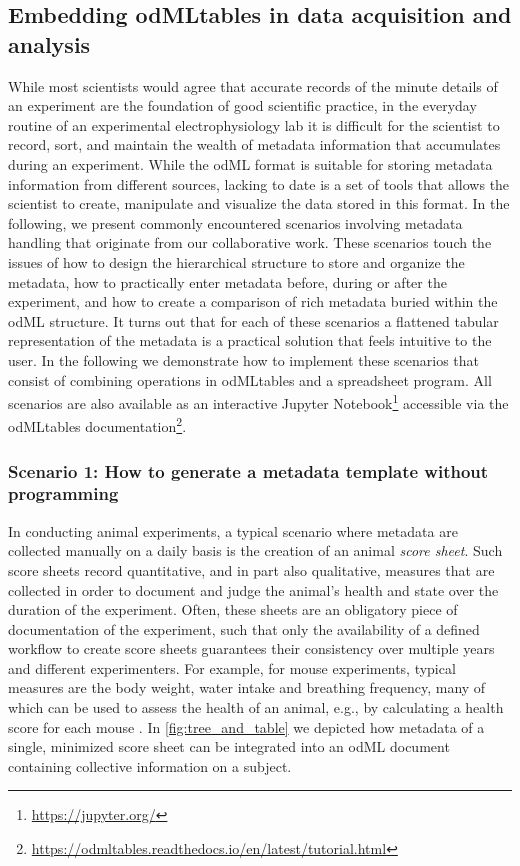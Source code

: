 \subsection{Embedding odMLtables in data acquisition and analysis}
\label{sec:Illustrative-Examples}

While most scientists would agree that accurate records of the minute details of an experiment are the foundation of good scientific practice, in the everyday routine of an experimental electrophysiology lab it is difficult for the scientist to record, sort, and maintain the wealth of metadata information that accumulates during an experiment. While the odML format is suitable for storing metadata information from different sources, lacking to date is a set of tools that allows the scientist to create, manipulate and visualize the data stored in this format. In the following, we present commonly encountered scenarios involving metadata handling that originate from our collaborative work. These scenarios touch the issues of how to design the hierarchical structure to store and organize the metadata, how to practically enter metadata before, during or after the experiment, and how to create a comparison of rich metadata buried within the odML structure. It turns out that for each of these scenarios a flattened tabular representation of the metadata is a practical solution that feels intuitive to the user. In the following we demonstrate how to implement these scenarios that consist of combining operations in odMLtables and a spreadsheet program. All scenarios are also available as an interactive Jupyter Notebook\footnote{\url{https://jupyter.org/}} accessible via the odMLtables documentation\footnote{\url{https://odmltables.readthedocs.io/en/latest/tutorial.html}}.

\subsubsection*{Scenario 1: How to generate a metadata template without programming}
\label{sec:Template-Generation}
In conducting animal experiments, a typical scenario where metadata are collected manually on a daily basis is the creation of an animal \textit{score sheet}. Such score sheets record quantitative, and in part also qualitative, measures that are collected in order to document and judge the animal's health and state over the duration of the experiment. Often, these sheets are an obligatory piece of documentation of the experiment, such that only the availability of a defined workflow to create score sheets guarantees their consistency over multiple years and different experimenters. For example, for mouse experiments, typical measures are the body weight, water intake and breathing frequency, many of which can be used to assess the health of an animal, e.g., by calculating a health score for each mouse \citep{Foltz_1999, Burkholder_2012}. In \cref{fig:tree_and_table} we depicted how metadata of a single, minimized score sheet can be integrated into an odML document containing collective information on a subject.

